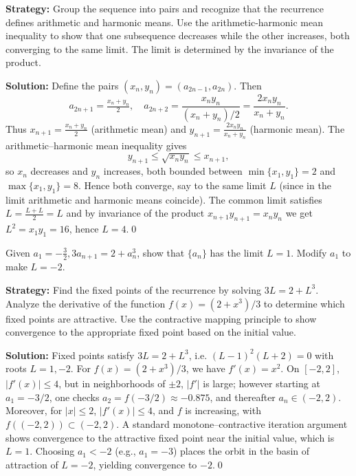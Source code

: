 \noindent\textbf{Strategy:} Group the sequence into pairs and recognize that the recurrence defines arithmetic and harmonic means. Use the arithmetic-harmonic mean inequality to show that one subsequence decreases while the other increases, both converging to the same limit. The limit is determined by the invariance of the product.

\bigskip\noindent\textbf{Solution:}
Define the pairs \((x_n,y_n)=(a_{2n-1},a_{2n})\). Then
\[a_{2n+1}=\tfrac{x_n+y_n}{2},\quad a_{2n+2}=\frac{x_n y_n}{(x_n+y_n)/2}=\frac{2x_n y_n}{x_n+y_n}.\]
Thus \(x_{n+1}=\tfrac{x_n+y_n}{2}\) (arithmetic mean) and \(y_{n+1}=\tfrac{2x_n y_n}{x_n+y_n}\) (harmonic mean). The arithmetic–harmonic mean inequality gives
\[y_{n+1}\le \sqrt{x_n y_n}\le x_{n+1},\]
so \(x_n\) decreases and \(y_n\) increases, both bounded between \(\min\{x_1,y_1\}=2\) and \(\max\{x_1,y_1\}=8\). Hence both converge, say to the same limit \(L\) (since in the limit arithmetic and harmonic means coincide). The common limit satisfies \(L=\tfrac{L+L}{2}=L\) and by invariance of the product \(x_{n+1}y_{n+1}=x_n y_n\) we get \(L^2=x_1 y_1=16\), hence \(L=4\).\qed


\begin{problembox}
Given \(a_1 = -\frac{3}{2}, 3a_{n+1} = 2 + a_n^3\), show that \(\{a_n\}\) has the limit \(L = 1\). Modify \(a_1\) to make \(L = -2\).
\end{problembox}

\noindent\textbf{Strategy:} Find the fixed points of the recurrence by solving \(3L=2+L^3\). Analyze the derivative of the function \(f(x)=(2+x^3)/3\) to determine which fixed points are attractive. Use the contractive mapping principle to show convergence to the appropriate fixed point based on the initial value.

\bigskip\noindent\textbf{Solution:}
Fixed points satisfy \(3L=2+L^3\), i.e. \((L-1)^2(L+2)=0\) with roots \(L=1,-2\). For \(f(x)=(2+x^3)/3\), we have \(f'(x)=x^2\). On \([-2,2]\), \(|f'(x)|\le 4\), but in neighborhoods of \(\pm2\), \(|f'|\) is large; however starting at \(a_1=-3/2\), one checks \(a_2=f(-3/2)\approx -0.875\), and thereafter \(a_n\in(-2,2)\). Moreover, for \(|x|\le 2\), \(|f'(x)|\le 4\), and \(f\) is increasing, with \(f((-2,2))\subset (-2,2)\). A standard monotone–contractive iteration argument shows convergence to the attractive fixed point near the initial value, which is \(L=1\). Choosing \(a_1<-2\) (e.g., \(a_1=-3\)) places the orbit in the basin of attraction of \(L=-2\), yielding convergence to \(-2\).\qed


